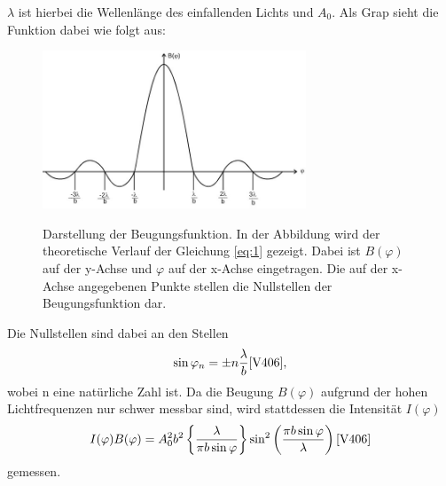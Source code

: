 $\lambda$ ist hierbei die Wellenlänge des einfallenden Lichts und $A_0$. %
Als Grap sieht die Funktion dabei wie folgt aus:
\begin{figure}
    \centering
    \includegraphics[width=0.7\textwidth]{images/graph.jpg}
    \label{fig:2}
    \caption{Darstellung der Beugungsfunktion\cite{V406}.
    In der Abbildung wird der theoretische Verlauf der Gleichung \eqref{eq:1} gezeigt. 
    Dabei ist $B(\varphi)$ auf der y-Achse und $\varphi$ auf der x-Achse eingetragen.
    Die auf der x-Achse angegebenen Punkte stellen die Nullstellen der Beugungsfunktion dar.
    }
\end{figure}
Die Nullstellen sind dabei an den Stellen
\begin{align}
    \sin \varphi _n = \pm n \frac{\lambda}{b} \text{\cite{V406}} \label{eq:3},
\end{align}
wobei n eine natürliche Zahl ist.
Da die  Beugung $B(\varphi)$ aufgrund der hohen Lichtfrequenzen nur schwer messbar sind,
wird stattdessen die Intensität $I(\varphi)$ 
\begin{align}
    I(\varphi)  B(\varphi) = A_0^2 b^2 \left\{\frac{\lambda}{\pi b \sin \varphi} \right\} \sin ^2 \left(\frac{\pi b \sin \varphi}{\lambda} \right) \text{\cite{V406}} \label{eq:4}
\end{align}
gemessen.\\


